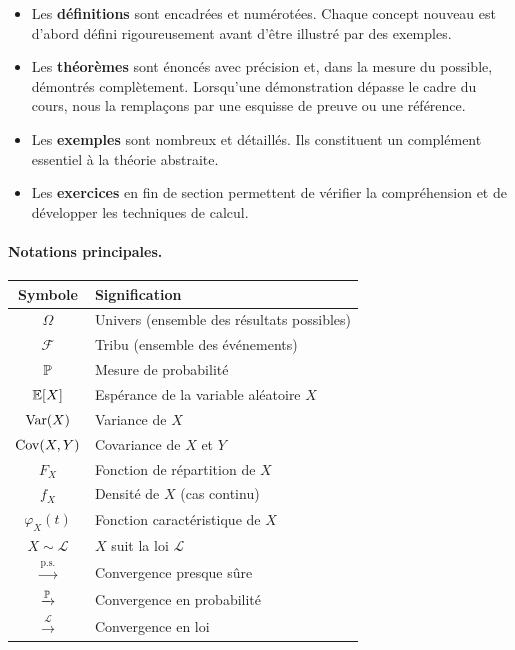 \begin{itemize}
    \item Les \textbf{d\'efinitions} sont encadr\'ees et num\'erot\'ees. Chaque concept
    nouveau est d'abord d\'efini rigoureusement avant d'\^etre illustr\'e par des exemples.

    \item Les \textbf{th\'eor\`emes} sont \'enonc\'es avec pr\'ecision et, dans la mesure
    du possible, d\'emontr\'es compl\`etement. Lorsqu'une d\'emonstration d\'epasse le
    cadre du cours, nous la rempla\c{c}ons par une esquisse de preuve ou une r\'ef\'erence.

    \item Les \textbf{exemples} sont nombreux et d\'etaill\'es. Ils constituent un
    compl\'ement essentiel \`a la th\'eorie abstraite.

    \item Les \textbf{exercices} en fin de section permettent de v\'erifier la
    compr\'ehension et de d\'evelopper les techniques de calcul.
\end{itemize}

\paragraph{Notations principales.}
\begin{center}
\renewcommand{\arraystretch}{1.3}
\begin{tabular}{cl}
    \toprule
    \textbf{Symbole} & \textbf{Signification} \\
    \midrule
    $\Omega$ & Univers (ensemble des r\'esultats possibles) \\
    $\mathcal{F}$ & Tribu (ensemble des \'ev\'enements) \\
    $\mathbb{P}$ & Mesure de probabilit\'e \\
    $\mathbb{E}[X]$ & Esp\'erance de la variable al\'eatoire $X$ \\
    $\mathrm{Var}(X)$ & Variance de $X$ \\
    $\mathrm{Cov}(X,Y)$ & Covariance de $X$ et $Y$ \\
    $F_X$ & Fonction de r\'epartition de $X$ \\
    $f_X$ & Densit\'e de $X$ (cas continu) \\
    $\varphi_X(t)$ & Fonction caract\'eristique de $X$ \\
    $X \sim \mathcal{L}$ & $X$ suit la loi $\mathcal{L}$ \\
    $\xrightarrow{\text{p.s.}}$ & Convergence presque s\^ure \\
    $\xrightarrow{\mathbb{P}}$ & Convergence en probabilit\'e \\
    $\xrightarrow{\mathcal{L}}$ & Convergence en loi \\
    \bottomrule
\end{tabular}
\end{center}

